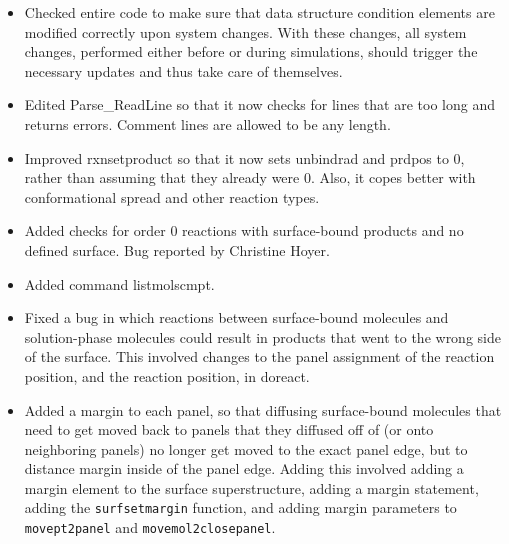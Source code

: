 \documentclass {scrbook}
\newcommand {\ttt} {\texttt}
\begin{document}
\begin{itemize}
\item Checked entire code to make sure that data structure condition elements are modified correctly upon system changes. With these changes, all system changes, performed either before or during simulations, should trigger the necessary updates and thus take care of themselves.
\item Edited Parse\_ReadLine so that it now checks for lines that are too long and returns errors. Comment lines are allowed to be any length.
\item Improved rxnsetproduct so that it now sets unbindrad and prdpos to 0, rather than assuming that they already were 0. Also, it copes better with conformational spread and other reaction types.
\item Added checks for order 0 reactions with surface-bound products and no defined surface. Bug reported by Christine Hoyer.
\item Added command listmolscmpt.
\item Fixed a bug in which reactions between surface-bound molecules and solution-phase molecules could result in products that went to the wrong side of the surface. This involved changes to the panel assignment of the reaction position, and the reaction position, in doreact.
\item Added a margin to each panel, so that diffusing surface-bound molecules that need to get moved back to panels that they diffused off of (or onto neighboring panels) no longer get moved to the exact panel edge, but to distance margin inside of the panel edge. Adding this involved adding a margin element to the surface superstructure, adding a margin statement, adding the \ttt{surfsetmargin} function, and adding margin parameters to \ttt{movept2panel} and \ttt{movemol2closepanel}.
\end{itemize}
\end{document}
